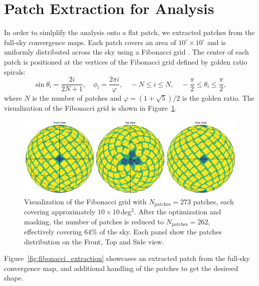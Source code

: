 \section{Patch Extraction for Analysis}
In order to simlplify the analysis onto a flat patch, we extracted patches from the full-sky convergence maps. Each patch covers an area of $10^\circ \times 10^\circ$ and is uniformly distributed across the sky using a Fibonacci grid \citep{2006QJRMS.132.1769S, 2023MNRAS.524.5591F}. The center of each patch is positioned at the vertices of the Fibonacci grid defined by golden ratio spirals:
\begin{equation}
    \sin \theta_i = \frac{2i}{2N + 1}, \quad \phi_i = \frac{2 \pi i}{\varphi}, \quad -N \leq i \leq N, \quad -\frac{\pi}{2} \leq \theta_i \leq \frac{\pi}{2},
\end{equation}
where $N$ is the number of patches and $\varphi = (1 + \sqrt{5})/2$ is the golden ratio. The visualization of the Fibonacci grid is shown in Figure~\ref{fig:fibonacci}.
\begin{figure}[ht]
    \centering
    \includegraphics[width=\textwidth]{figures/fibonacci_grid.png}
    \caption{Visualization of the Fibonacci grid with $N_{\text{patches}} = 273$ patches, each covering approximately $10 \times 10$\,deg$^2$. 
    After the optimization and masking, the number of patches is reduced to $N_{\text{patches}} = 262$, effectively covering $64 \%$ of the sky.
    Each panel show the patches distribution on the Front, Top and Side view.}\label{fig:fibonacci}
\end{figure}

Figure~\ref{fig:fibonacci_extraction} showcases an extracted patch from the full-sky convergence map, and additional handling of the patches to get the desireed shape.

